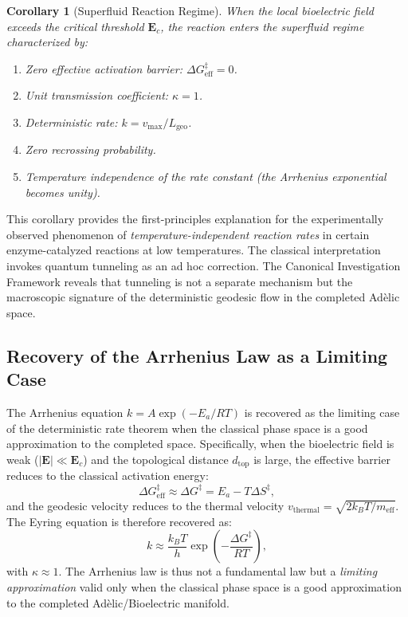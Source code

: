 \documentclass[11pt,openany]{extbook}
\theoremstyle{plain}
\newtheorem{corollary}{Corollary}[theorem]
\theoremstyle{definition}
\begin{document}
\begin{corollary}[Superfluid Reaction Regime]
When the local bioelectric field exceeds the critical threshold $\mathbf{E}_c$, the reaction enters the superfluid regime characterized by:
\begin{enumerate}
\item Zero effective activation barrier: $\Delta G^{\ddagger}_{\mathrm{eff}} = 0$.
\item Unit transmission coefficient: $\kappa = 1$.
\item Deterministic rate: $k = v_{\mathrm{max}} / L_{\mathrm{geo}}$.
\item Zero recrossing probability.
\item Temperature independence of the rate constant (the Arrhenius exponential becomes unity).
\end{enumerate}
\end{corollary}

\noindent This corollary provides the first-principles explanation for the experimentally observed phenomenon of \emph{temperature-independent reaction rates} in certain enzyme-catalyzed reactions at low temperatures. The classical interpretation invokes quantum tunneling as an ad hoc correction. The Canonical Investigation Framework reveals that tunneling is not a separate mechanism but the macroscopic signature of the deterministic geodesic flow in the completed Adèlic space.

\subsection{Recovery of the Arrhenius Law as a Limiting Case}

\noindent The Arrhenius equation $k = A \exp(-E_a / RT)$ is recovered as the limiting case of the deterministic rate theorem when the classical phase space is a good approximation to the completed space. Specifically, when the bioelectric field is weak ($|\mathbf{E}| \ll \mathbf{E}_c$) and the topological distance $d_{\mathrm{top}}$ is large, the effective barrier reduces to the classical activation energy:
\[
\Delta G^{\ddagger}_{\mathrm{eff}} \approx \Delta G^{\ddagger} = E_a - T\Delta S^{\ddagger},
\]
and the geodesic velocity reduces to the thermal velocity $v_{\mathrm{thermal}} = \sqrt{2k_B T / m_{\mathrm{eff}}}$. The Eyring equation is therefore recovered as:
\[
k \approx \frac{k_B T}{h} \exp\!\left(-\frac{\Delta G^{\ddagger}}{RT}\right),
\]
with $\kappa \approx 1$. The Arrhenius law is thus not a fundamental law but a \emph{limiting approximation} valid only when the classical phase space is a good approximation to the completed Adèlic/Bioelectric manifold.
\end{document}
